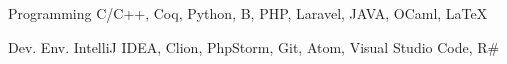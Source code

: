 

\begin{cvskills}

  \cvskill
    {Programming} %
    {C/C++, Coq, Python, B, PHP, Laravel, JAVA, OCaml, \LaTeX} %

  \cvskill
    {Dev. Env.} %
    {IntelliJ IDEA, Clion, PhpStorm, Git, Atom, Visual Studio Code, R\#} %

\end{cvskills}

